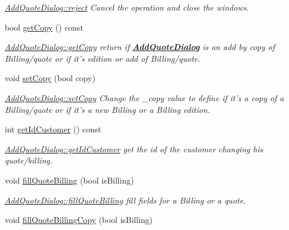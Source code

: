 \begin{DoxyCompactItemize}
\begin{DoxyCompactList}\small\item\em \hyperlink{classGui_1_1Dialogs_1_1AddQuoteDialog_a1ae935c40fb54142aad3a610a137bd36}{Add\-Quote\-Dialog\-::reject} Cancel the operation and close the windows. \end{DoxyCompactList}\item 
bool \hyperlink{classGui_1_1Dialogs_1_1AddQuoteDialog_a343bac79889747e55412d11bd2e27cbb}{get\-Copy} () const 
\begin{DoxyCompactList}\small\item\em \hyperlink{classGui_1_1Dialogs_1_1AddQuoteDialog_a343bac79889747e55412d11bd2e27cbb}{Add\-Quote\-Dialog\-::get\-Copy} return if {\bfseries \hyperlink{classGui_1_1Dialogs_1_1AddQuoteDialog}{Add\-Quote\-Dialog}} is an add by copy of Billing/quote or if it's edition or add of Billing/quote. \end{DoxyCompactList}\item 
void \hyperlink{classGui_1_1Dialogs_1_1AddQuoteDialog_add29bc442ab7783f062b594a97fc8270}{set\-Copy} (bool copy)
\begin{DoxyCompactList}\small\item\em \hyperlink{classGui_1_1Dialogs_1_1AddQuoteDialog_add29bc442ab7783f062b594a97fc8270}{Add\-Quote\-Dialog\-::set\-Copy} Change the {\itshape \-\_\-copy} value to define if it's a copy of a Billing/quote or if it's a new Billing or a Billing edition. \end{DoxyCompactList}\item 
int \hyperlink{classGui_1_1Dialogs_1_1AddQuoteDialog_a66985973f98f553545a138d6abfe148b}{get\-Id\-Customer} () const 
\begin{DoxyCompactList}\small\item\em \hyperlink{classGui_1_1Dialogs_1_1AddQuoteDialog_a66985973f98f553545a138d6abfe148b}{Add\-Quote\-Dialog\-::get\-Id\-Customer} get the id of the customer changing his quote/billing. \end{DoxyCompactList}\item 
void \hyperlink{classGui_1_1Dialogs_1_1AddQuoteDialog_ac4c7b242d3340b1b03d0d5bac12b0100}{fill\-Quote\-Billing} (bool is\-Billing)
\begin{DoxyCompactList}\small\item\em \hyperlink{classGui_1_1Dialogs_1_1AddQuoteDialog_ac4c7b242d3340b1b03d0d5bac12b0100}{Add\-Quote\-Dialog\-::fill\-Quote\-Billing} fill fields for a Billing or a quote. \end{DoxyCompactList}\item 
\hypertarget{classGui_1_1Dialogs_1_1AddQuoteDialog_a3fcb23cd52dd2cd9a4b607844c4bd9cd}{void \hyperlink{classGui_1_1Dialogs_1_1AddQuoteDialog_a3fcb23cd52dd2cd9a4b607844c4bd9cd}{fill\-Quote\-Billing\-Copy} (bool is\-Billing)}\label{classGui_1_1Dialogs_1_1AddQuoteDialog_a3fcb23cd52dd2cd9a4b607844c4bd9cd}


\end{DoxyCompactItemize}
